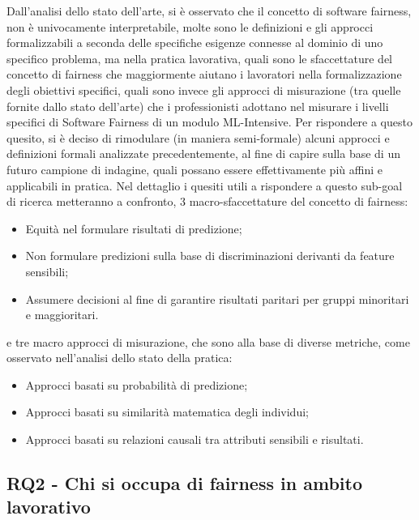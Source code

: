 	Dall'analisi dello stato dell'arte, si è osservato che il concetto di software fairness, non è univocamente interpretabile, molte sono le definizioni e gli approcci formalizzabili a seconda delle specifiche esigenze connesse al dominio di uno specifico problema, ma nella pratica lavorativa, quali sono le sfaccettature del concetto di fairness che maggiormente aiutano i lavoratori nella formalizzazione degli obiettivi specifici, quali sono invece gli approcci di misurazione (tra quelle fornite dallo stato dell'arte) che i professionisti adottano nel misurare i livelli specifici di Software Fairness di un modulo ML-Intensive. Per rispondere a questo quesito, si è deciso di rimodulare (in maniera semi-formale) alcuni approcci e definizioni formali analizzate precedentemente, al fine di capire sulla base di un futuro campione di indagine, quali possano essere effettivamente più affini e applicabili in pratica. Nel dettaglio i quesiti utili a rispondere a questo sub-goal di ricerca metteranno a confronto, 3 macro-sfaccettature del concetto di fairness:
	
	\begin{itemize}
		\item Equità nel formulare risultati di predizione;
		\item Non formulare predizioni sulla base di discriminazioni derivanti da feature sensibili;
		\item Assumere decisioni al fine di garantire risultati paritari per gruppi minoritari e maggioritari.
	\end{itemize}

	e tre macro approcci di misurazione, che sono alla base di diverse metriche, come osservato nell'analisi dello stato della pratica:
	
	\begin{itemize}
		\item Approcci basati su probabilità di predizione;
		\item Approcci basati su similarità matematica degli individui;
		\item Approcci basati su relazioni causali tra attributi sensibili e risultati.
	\end{itemize}
	\newpage
	
	\subsection{RQ2 - Chi si occupa di fairness in ambito lavorativo}
	\begin{center}
		\hspace*{-5mm}%
	\end{center}
	
